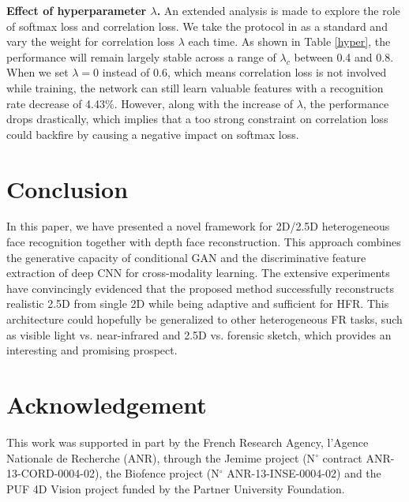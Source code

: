\documentclass{bmvc2k}
\begin{document}
\textbf{Effect of hyperparameter $\lambda$.} An extended analysis is made to explore the role of softmax loss and correlation loss. We take the protocol in \cite{huang2012oriented} as a standard and vary the weight for correlation loss $\lambda$ each time. As shown in Table \ref{hyper}, the performance will remain largely stable across a range of $\lambda_c$ between 0.4 and 0.8. When we set $\lambda=0$ instead of 0.6, which means correlation loss is not involved while training, the network can still learn valuable features with a recognition rate decrease of 4.43$\%$. However, along with the increase of $\lambda$, the performance drops drastically, which implies that a too strong constraint on correlation loss could backfire by causing a negative impact on softmax loss.


\section{Conclusion}
In this paper, we have presented a novel framework for 2D/2.5D heterogeneous face recognition together with depth face reconstruction. This approach combines the generative capacity of conditional GAN and the discriminative feature extraction of deep CNN for cross-modality learning. The extensive experiments have convincingly evidenced that the proposed method successfully reconstructs realistic 2.5D from single 2D while being adaptive and sufficient for HFR. This architecture could hopefully be generalized to other heterogeneous FR tasks, such as visible light vs. near-infrared and 2.5D vs. forensic sketch, which provides an interesting and promising prospect.

\section{Acknowledgement}
This work was supported in part by the French Research Agency, l'Agence Nationale de Recherche (ANR), through the Jemime project (N$^\circ$ contract ANR-13-CORD-0004-02), the Biofence project (N$^\circ$ ANR-13-INSE-0004-02) and the PUF 4D Vision project funded by the Partner University Foundation.



\end{document}
